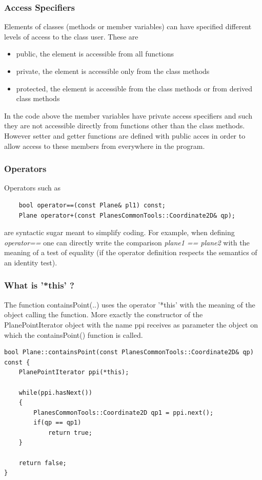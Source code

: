\subsubsection {Access Specifiers}
Elements of classes (methods or member variables) can have specified different levels of access to the class user. These are 
\begin{itemize}
\item public, the element is accessible from all functions
\item private, the element is accessible only from the class methods
\item protected, the element is accessible from the class methods or from derived class methods
\end{itemize}  
In the code above the member variables have private access specifiers and such they are not accessible directly from functions other than the class methods. However setter and getter functions are defined with public acces in order to allow access to these members from everywhere in the program. 

\subsubsection {Operators}
Operators such as
\begin{lstlisting}
    bool operator==(const Plane& pl1) const;
    Plane operator+(const PlanesCommonTools::Coordinate2D& qp);
\end{lstlisting}
are syntactic sugar meant to simplify coding. For example, when defining \textit{operator==} one can directly write the comparison \textit{ plane1 == plane2 } with the meaning of a test of equality (if the operator definition respects the semantics of an identity test). 

\subsubsection {What is '*this' ? }
The function containsPoint(..) uses the operator '*this' with the meaning of the object calling the function. More exactly the constructor of the PlanePointIterator object with the name ppi receives as parameter the object on which the containsPoint() function is called.

\begin{lstlisting}
bool Plane::containsPoint(const PlanesCommonTools::Coordinate2D& qp) const {
    PlanePointIterator ppi(*this);

    while(ppi.hasNext())
    {
        PlanesCommonTools::Coordinate2D qp1 = ppi.next();
        if(qp == qp1)
            return true;
    }

    return false;
}
\end{lstlisting}

